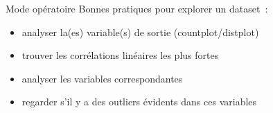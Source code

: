 \begin{frame}{Mode opératoire}
  Bonnes pratiques pour explorer un dataset :
  \begin{itemize}[<+->]
  \item analyser la(es) variable(s) de sortie (countplot/distplot)
  \item trouver les corrélations linéaires les plus fortes
  \item analyser les variables correspondantes
  \item regarder s'il y a des outliers évidents dans ces variables
  \end{itemize}
\end{frame}
